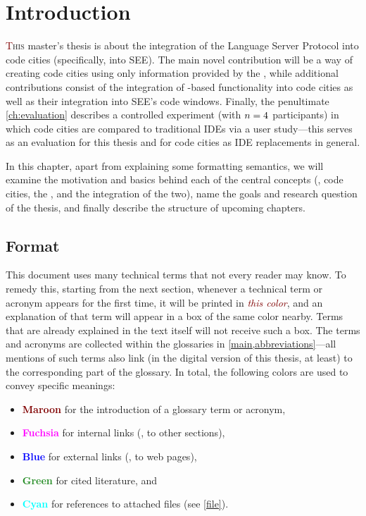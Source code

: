 \documentclass[../thesis]{subfiles}
\begin{document}
\chapter{Introduction}

\lettrine[lines=3]{\textcolor{Maroon}{T}}{his} master's thesis is about the integration of the Language Server Protocol into code cities (specifically, into SEE).
The main novel contribution will be a way of creating code cities using only information provided by the , while additional contributions consist of the integration of -based functionality into code cities as well as their integration into SEE's code windows.
Finally, the penultimate \cref{ch:evaluation} describes a controlled experiment (with $n=4$ participants) in which code cities are compared to traditional IDEs via a user study---this serves as an evaluation for this thesis and for code cities as IDE replacements in general.

In this chapter, apart from explaining some formatting semantics, we will examine the motivation and basics behind each of the central concepts (\ie, code cities, the , and the integration of the two), name the goals and research question of the thesis, and finally describe the structure of upcoming chapters.

\section{Format}

This document uses many technical terms that not every reader may know.
To remedy this, starting from the next section, whenever a technical term or acronym appears for the first time, it will be printed in \emph{\textcolor{Maroon}{this color}}, and an explanation of that term will appear in a box of the same color nearby.
Terms that are already explained in the text itself will not receive such a box.
The terms and acronyms are collected within the glossaries in \cref{main,abbreviations}---all mentions of such terms also link (in the digital version of this thesis, at least) to the corresponding part of the glossary.
In total, the following colors are used to convey specific meanings:
\begin{itemize}
	\item \textbf{\textcolor{Maroon}{Maroon}} for the introduction of a glossary term or acronym,
	\item \textbf{\textcolor{Fuchsia}{Fuchsia}} for internal links (\eg, to other sections),
	\item \textbf{\textcolor{Blue}{Blue}} for external links (\eg, to web pages),
	\item \textbf{\textcolor{ForestGreen}{Green}} for cited literature, and
	\item \textbf{\textcolor{Cyan}{Cyan}} for references to attached files (see \cref{file}).
\end{itemize}
\end{document}

